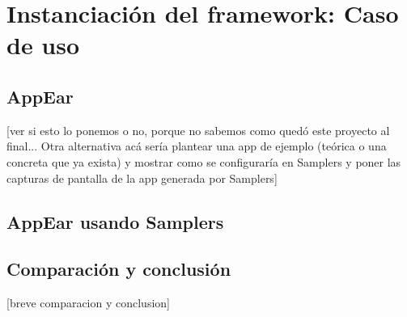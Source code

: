 \chapter{Instanciación del framework: Caso de uso}

\section{AppEar}
[ver si esto lo ponemos o no, porque no sabemos como quedó este proyecto al final... Otra alternativa acá sería plantear una app de ejemplo (teórica o una concreta que ya exista) y mostrar como se configuraría en Samplers y poner las capturas de pantalla de la app generada por Samplers]

\section{AppEar usando Samplers}

\section{Comparación y conclusión}
[breve comparacion y conclusion]